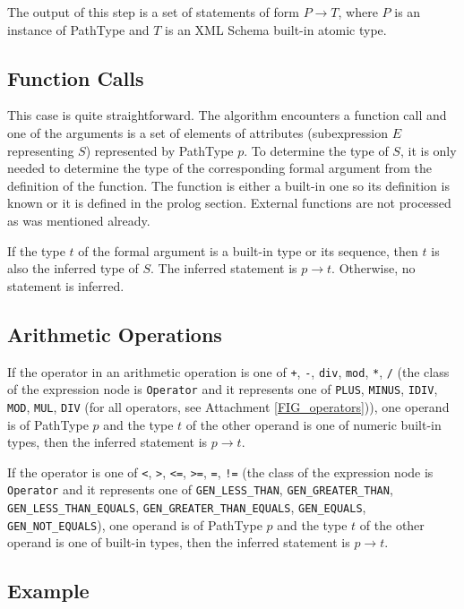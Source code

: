 The output of this step is a set of statements of form $P \rightarrow T$, where $P$ is an instance of PathType and $T$ is an XML Schema built-in atomic type.

\subsection{Function Calls}\label{SUBSECTION_function_calls}
This case is quite straightforward. The algorithm encounters a function call and one of the arguments is a set of elements of attributes (subexpression $E$ representing $S$) represented by PathType $p$. To determine the type of $S$, it is only needed to determine the type of the corresponding formal argument from the definition of the function. The function is either a built-in one so its definition is known or it is defined in the prolog section. External functions are not processed as was mentioned already.

If the type $t$ of the formal argument is a built-in type or its sequence, then $t$ is also the inferred type of $S$. The inferred statement is $p \rightarrow t$. Otherwise, no statement is inferred.

\subsection{Arithmetic Operations}
If the operator in an arithmetic operation is one of \texttt{+}, \texttt{-}, \texttt{div}, \texttt{mod}, \texttt{*}, \texttt{/} (the class of the expression node is \texttt{Operator} and it represents one of \texttt{PLUS}, \texttt{MINUS}, \texttt{IDIV}, \texttt{MOD}, \texttt{MUL}, \texttt{DIV} (for all operators, see Attachment \ref{FIG_operators})), one operand is of PathType $p$ and the type $t$ of the other operand is one of numeric built-in types, then the inferred statement is $p \rightarrow t$.

If the operator is one of \texttt{<}, \texttt{>}, \texttt{<=}, \texttt{>=}, \texttt{=}, \texttt{!=} (the class of the expression node is \texttt{Operator} and it represents one of \texttt{GEN\_LESS\_THAN}, \texttt{GEN\_GREATER\_THAN}, \texttt{GEN\_LESS\_THAN\_EQUALS}, \texttt{GEN\_GREATER\_THAN\_EQUALS}, \texttt{GEN\_EQUALS}, \\ \texttt{GEN\_NOT\_EQUALS}), one operand is of PathType $p$ and the type $t$ of the other operand is one of built-in types, then the inferred statement is $p \rightarrow t$.

\subsection{Example}

